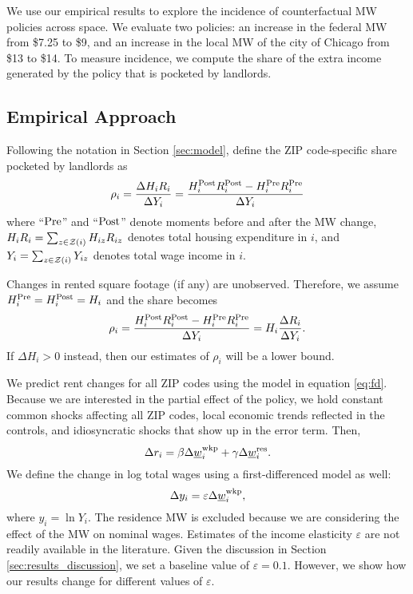 
We use our empirical results to explore the incidence of counterfactual 
MW policies across space.
We evaluate two policies:
an increase in the federal MW from \$7.25 to \$9, and
an increase in the local MW of the city of Chicago from \$13 to \$14.
To measure incidence, we compute the share of the extra income generated by the 
policy that is pocketed by landlords.

\subsection{Empirical Approach}\label{sec:emp_cf}

Following the notation in Section \ref{sec:model}, define the ZIP code-specific 
share pocketed by landlords as
\begin{equation*}
    \rho_i = \frac{\Delta H_i R_i}{\Delta Y_i} 
           = \frac{H^{\text{Post}}_i R^{\text{Post}}_i - H^{\text{Pre}}_i R^{\text{Pre}}_i}{\Delta Y_i} 
\end{equation*}
where
``$\text{Pre}$'' and ``$\text{Post}$'' denote moments before and after the MW change,
$H_i R_i = \sum_{z\in\mathcal{Z}(i)} H_{iz} R_{iz}$ denotes total housing expenditure 
in $i$, and
$Y_i = \sum_{z\in\mathcal{Z}(i)} Y_{iz}$ denotes total wage income in $i$.

Changes in rented square footage (if any) are unobserved.
Therefore, we assume $H^{\text{Pre}}_i = H^{\text{Post}}_i = H_i$ and the share becomes
\begin{equation}\label{eq:share_pocketed}
    \rho_i = \frac{H^{\text{Post}}_i R^{\text{Post}}_i - H^{\text{Pre}}_i R^{\text{Pre}}_i}{\Delta Y_i} = 
                H_i \frac{\Delta R_i}{\Delta Y_i} .
\end{equation}
If $\Delta H_i > 0$ instead, then our estimates of $\rho_i$ will be a lower 
bound.

We predict rent changes for all ZIP codes using the model in equation 
\eqref{eq:fd}.
Because we are interested in the partial effect of the policy, we hold constant 
common shocks affecting all ZIP codes,
local economic trends reflected in the controls, and
idiosyncratic shocks that show up in the error term.
Then,
\begin{equation}\label{eq:cf_rents_model}
    \Delta r_i = \beta \Delta \underline{w}_i^{\text{wkp}} + \gamma \Delta \underline{w}_i^{\text{res}} .
\end{equation}
We define the change in log total wages using a first-differenced model as well:
\begin{equation}\label{eq:cf_wages_model}
    \Delta y_i = \varepsilon \Delta \underline{w}_i^{\text{wkp}} ,
\end{equation}
where $y_i=\ln Y_i$.
The residence MW is excluded because we are considering the effect of the MW on 
nominal wages.
Estimates of the income elasticity $\varepsilon$ are not readily available 
in the literature.
Given the discussion in Section \ref{sec:results_discussion}, we set a 
baseline value of $\varepsilon = 0.1$.
However, we show how our results change for different values of $\varepsilon$.

